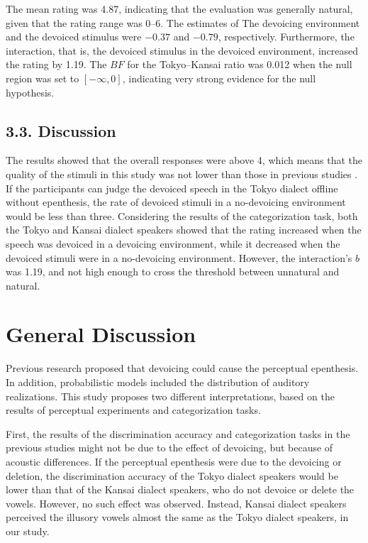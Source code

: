 \documentclass[a4paper,11pt,twocolumn]{article}
\begin{document}
The mean rating was 4.87, indicating that the evaluation was generally natural, given that the rating range was 0--6. The estimates of The devoicing environment and the devoiced stimulus were $-0.37$ and $-0.79$, respectively. Furthermore, the interaction, that is, the devoiced stimulus in the devoiced environment, increased the rating by 1.19. The $BF$ for the Tokyo--Kansai ratio was 0.012 when the null region was set to $[-\infty, 0]$, indicating very strong evidence for the null hypothesis.

\subsection{3.3. Discussion}

The results showed that the overall responses were above 4, which means that the quality of the stimuli in this study was not lower than those in previous studies \cite{kilpatrick2018japanese}. If the participants can judge the devoiced speech in the Tokyo dialect offline without epenthesis, the rate of devoiced stimuli in a no-devoicing environment would be less than three. Considering the results of the categorization task, both the Tokyo and Kansai dialect speakers showed that the rating increased when the speech was devoiced in a devoicing environment, while it decreased when the devoiced stimuli were in a no-devoicing environment. However, the interaction's $b$ was 1.19, and not high enough to cross the threshold between unnatural and natural.

\section{General Discussion}

Previous research proposed that devoicing could cause the perceptual epenthesis. In addition, probabilistic models included the distribution of auditory realizations. This study proposes two different interpretations, based on the results of perceptual experiments and categorization tasks.

First, the results of the discrimination accuracy and categorization tasks in the previous studies might not be due to the effect of devoicing, but because of acoustic differences. If the perceptual epenthesis were due to the devoicing or deletion, the discrimination accuracy of the Tokyo dialect speakers would be lower than that of the Kansai dialect speakers, who do not devoice or delete the vowels. However, no such effect was observed. Instead, Kansai dialect speakers perceived the illusory vowels almost the same as the Tokyo dialect speakers, in our study.
\end{document}
